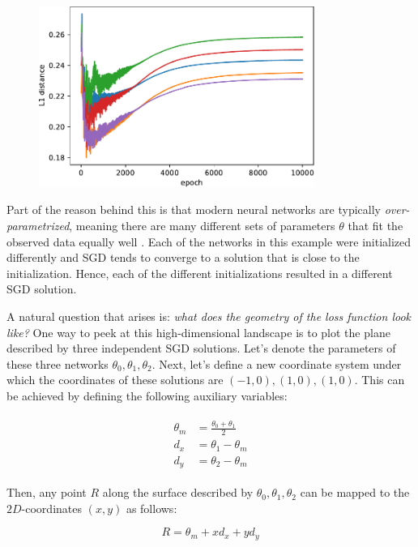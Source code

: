 \documentclass[12pt]{article}
\begin{document}
\begin{figure}[ht]
\centering
\includegraphics[width=9cm]{plots/1d_ens_param_distance.pdf}
\caption{}
\label{fig_1d_ens_param_distance}
\end{figure}

Part of the reason behind this is that modern neural networks are typically \textit{over-parametrized}, meaning there are many different sets of parameters $\theta$ that fit the observed data equally well \cite{underspecification, deep_ens, mode_connectivity}. Each of the networks in this example were initialized differently and SGD tends to converge to a solution that is close to the initialization. Hence, each of the different initializations resulted in a different SGD solution.

A natural question that arises is: \textit{what does the geometry of the loss function look like?} One way to peek at this high-dimensional landscape is to plot the plane described by three independent SGD solutions. Let's denote the parameters of these three networks $\theta_0, \theta_1, \theta_2$. Next, let's define a new coordinate system under which the coordinates of these solutions are $(-1, 0), (1, 0), (1, 0)$. This can be achieved by defining the following auxiliary variables:

\begin{align}
\begin{split}
\theta_m &= \frac{\theta_0 + \theta_1}{2} \\
d_x &= \theta_1 - \theta_m \\
d_y &= \theta_2 - \theta_m
\end{split}
\end{align}

Then, any point $R$ along the surface described by $\theta_0, \theta_1, \theta_2$ can be mapped to the $2D$-coordinates $(x, y)$ as follows:

\begin{equation}
R = \theta_m + x d_x + y d_y
\end{equation}
\end{document}
